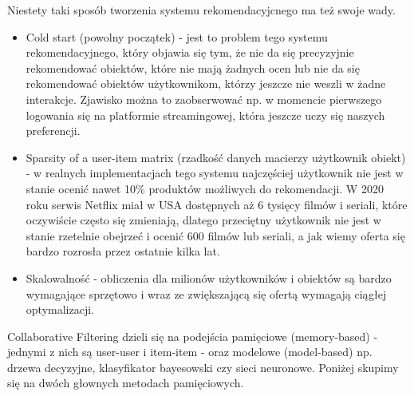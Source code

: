 \documentclass{article}
\begin{document}
Niestety taki sposób tworzenia systemu rekomendacyjcnego ma też swoje wady.
\begin{itemize}
    \item Cold start (powolny początek) - jest to problem tego systemu rekomendacyjnego, który objawia się tym, że nie da się precyzyjnie rekomendować obiektów, które nie mają żadnych ocen lub nie da się rekomendować obiektów użytkownikom, którzy jeszcze nie weszli w żadne interakcje. Zjawisko można to zaobserwować np. w momencie pierwszego logowania się na platformie streamingowej, która jeszcze uczy się naszych preferencji.
    \item Sparsity of a user-item matrix (rzadkość danych macierzy użytkownik obiekt) - w realnych implementacjach tego systemu najczęściej użytkownik nie jest w stanie ocenić nawet 10\% produktów możliwych do rekomendacji. W 2020 roku serwis Netflix miał w USA dostępnych aż 6 tysięcy filmów i seriali, które oczywiście często się zmieniają, dlatego przeciętny użytkownik nie jest w stanie rzetelnie obejrzeć i ocenić 600 filmów lub seriali, a jak wiemy oferta się bardzo rozrosła przez ostatnie kilka lat.
    \item Skalowalność - obliczenia dla milionów użytkowników i obiektów są bardzo wymagające sprzętowo i wraz ze zwiększającą się ofertą wymagają ciągłej optymalizacji.
\end{itemize}
Collaborative Filtering dzieli się na podejścia pamięciowe (memory-based) - jednymi z nich są user-user i item-item - oraz modelowe (model-based) np. drzewa decyzyjne, klasyfikator bayesowski czy sieci neuronowe. Poniżej skupimy się na dwóch głownych metodach pamięciowych.
\end{document}
